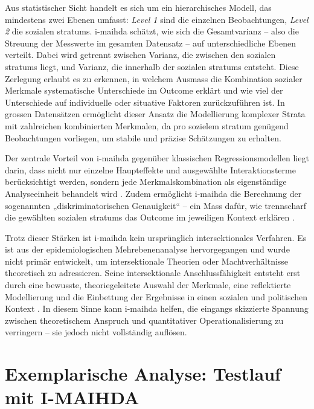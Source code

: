 Aus statistischer Sicht handelt es sich um ein hierarchisches Modell, das mindestens zwei Ebenen umfasst: \textit{Level 1} sind die einzelnen Beobachtungen, \textit{Level 2} die sozialen \glspl{stratum}. \gls{i-maihda} schätzt, wie sich die Gesamtvarianz -- also die Streuung der Messwerte im gesamten Datensatz -- auf unterschiedliche Ebenen verteilt. Dabei wird getrennt zwischen Varianz, die zwischen den sozialen \glspl{stratum} liegt, und Varianz, die innerhalb der sozialen \glspl{stratum} entsteht. Diese Zerlegung erlaubt es zu erkennen, in welchem Ausmass die Kombination sozialer Merkmale systematische Unterschiede im Outcome erklärt und wie viel der Unterschiede auf individuelle oder situative Faktoren zurückzuführen ist. In grossen Datensätzen ermöglicht dieser Ansatz die Modellierung komplexer Strata mit zahlreichen kombinierten Merkmalen, da pro sozielem \gls{stratum} genügend Beobachtungen vorliegen, um stabile und präzise Schätzungen zu erhalten.

Der zentrale Vorteil von \gls{i-maihda} gegenüber klassischen Regressionsmodellen liegt darin, dass nicht nur einzelne Haupteffekte und ausgewählte Interaktionsterme berücksichtigt werden, sondern jede Merkmalskombination als eigenständige Analyseeinheit behandelt wird \parencite{hancockWhenMultiplicationDoesnt2007, bowlegInvitedReflectionQuantifying2016}. Zudem ermöglicht \gls{i-maihda} die Berechnung der sogenannten „diskriminatorischen Genauigkeit“ -- ein Mass dafür, wie trennscharf die gewählten sozialen \glspl{stratum} das Outcome im jeweiligen Kontext erklären \parencite{evansTutorialConductingIntersectional2024}.

Trotz dieser Stärken ist \gls{i-maihda} kein ursprünglich intersektionales Verfahren. Es ist aus der epidemiologischen Mehrebenenanalyse hervorgegangen und wurde nicht primär entwickelt, um intersektionale Theorien oder Machtverhältnisse theoretisch zu adressieren. Seine intersektionale Anschlussfähigkeit entsteht erst durch eine bewusste, theoriegeleitete Auswahl der Merkmale, eine reflektierte Modellierung und die Einbettung der Ergebnisse in einen sozialen und politischen Kontext \parencite{grossModellingIntersectionalityQuantitative2023}. In diesem Sinne kann \gls{i-maihda} helfen, die eingangs skizzierte Spannung zwischen theoretischem Anspruch und quantitativer Operationalisierung zu verringern -- sie jedoch nicht vollständig auflösen.

\section{Exemplarische Analyse: Testlauf mit I-MAIHDA}

